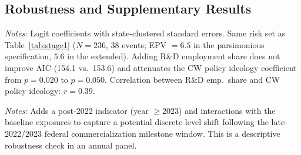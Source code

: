 \documentclass[12pt]{article}
\begin{document}



\clearpage
\begin{appendices}

\section{Robustness and Supplementary Results}
\label{app:robustness}

\begin{table}[htbp]
\centering
\begin{threeparttable}
\caption{Stage 1: Extended Specification with R\&D Employment Share}
\label{tab:stage1_extended}

\begin{tablenotes}[flushleft]
\footnotesize
\item \textit{Notes:} Logit coefficients with state-clustered standard errors.  Same risk set as Table~\ref{tab:stage1} ($N = 236$, 38 events; EPV $= 6.5$ in the parsimonious specification, $5.6$ in the extended).  Adding R\&D employment share does not improve AIC (154.1 vs.\ 153.6) and attenuates the CW policy ideology coefficient from $p = 0.020$ to $p = 0.050$.  Correlation between R\&D emp.\ share and CW policy ideology: $r = 0.39$.
\end{tablenotes}
\end{threeparttable}
\end{table}

\begin{table}[htbp]
\centering
\begin{threeparttable}
\footnotesize
\caption{Stage 1: Post-2022 Federal Commercialization Interaction Robustness (2023+)}
\label{tab:stage1_post_fda}

\begin{tablenotes}[flushleft]
\footnotesize
\item \textit{Notes:} Adds a post-2022 indicator (year $\geq 2023$) and interactions with the baseline exposures to capture a potential discrete level shift following the late-2022/2023 federal commercialization milestone window. This is a descriptive robustness check in an annual panel.
\end{tablenotes}
\end{threeparttable}
\end{table}


\end{appendices}
\end{document}
